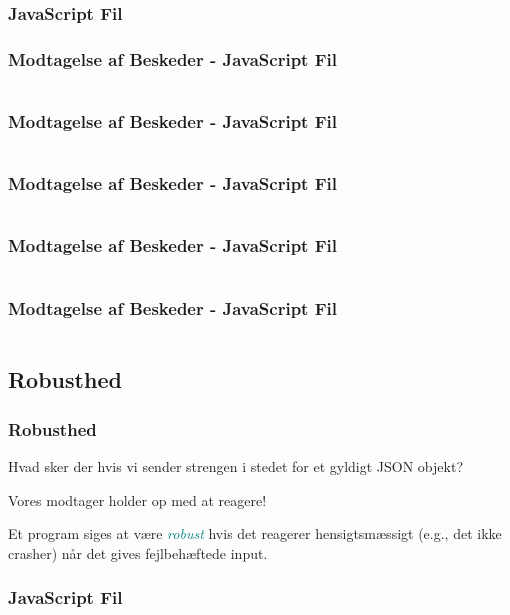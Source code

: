\subsubsection{JavaScript Fil}
\begin{frame}
    \frametitle{Modtagelse af Beskeder - JavaScript Fil}
    \vspace{-1mm}
    \inputminted[fontsize=\normalsize,highlightlines={}]{javascript}{../src/frontend/part7_publish/logic.js}
\end{frame}
\begin{frame}
    \frametitle{Modtagelse af Beskeder - JavaScript Fil}
    \vspace{-1mm}
    \inputminted[fontsize=\normalsize,highlightlines={1}]{javascript}{../src/frontend/part7_publish/logic.js}
\end{frame}
\begin{frame}
    \frametitle{Modtagelse af Beskeder - JavaScript Fil}
    \vspace{-1mm}
    \inputminted[fontsize=\normalsize,highlightlines={3,4}]{javascript}{../src/frontend/part7_publish/logic.js}
\end{frame}
\begin{frame}
    \frametitle{Modtagelse af Beskeder - JavaScript Fil}
    \vspace{-1mm}
    \inputminted[fontsize=\normalsize,highlightlines={14,6}]{javascript}{../src/frontend/part7_publish/logic.js}
\end{frame}
\begin{frame}
    \frametitle{Modtagelse af Beskeder - JavaScript Fil}
    \vspace{-1mm}
    \inputminted[fontsize=\normalsize,highlightlines={9}]{javascript}{../src/frontend/part7_publish/logic.js}
\end{frame}

\subsection{Robusthed}
\begin{frame}
    \frametitle{Robusthed}
    Hvad sker der hvis vi sender strengen  i stedet for et gyldigt JSON objekt?
    \pause
    
    \vspace{5mm}
    Vores modtager holder op med at reagere!
    \pause
    
    \vspace{5mm}
    Et program siges at være \textcolor{teal}{\textsl{robust}} hvis det reagerer hensigtsmæssigt (e.g., det ikke crasher) når det gives fejlbehæftede input.
\end{frame}
\begin{frame}
    \frametitle{JavaScript Fil}
    \vspace{-2mm}
    \begin{multicols}{2}
      \inputminted[fontsize=\tiny,highlightlines={31-35}]{javascript}{../src/frontend/part7_plot/logic.js}
    \end{multicols}
\end{frame}

